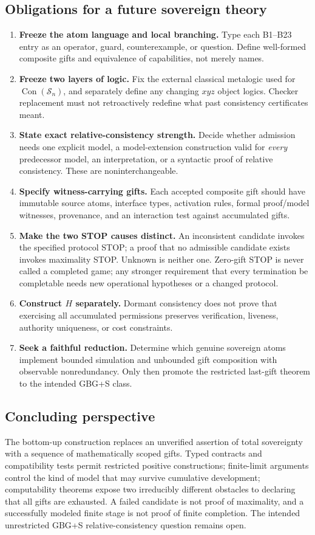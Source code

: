 \documentclass[11pt,letterpaper]{article}
\theoremstyle{definition}\newtheorem{definition}[theorem]{Definition}\newtheorem{example}[theorem]{Example}
\theoremstyle{remark}\newtheorem{remark}[theorem]{Remark}
\newcommand{\Con}{\operatorname{Con}}
\newcommand{\Stage}{\mathcal{S}}
\begin{document}
\subsection{Obligations for a future sovereign theory}
\begin{enumerate}
\item \textbf{Freeze the atom language and local branching.} Type each B1--B23 entry as an operator, guard, counterexample, or question. Define well-formed composite gifts and equivalence of capabilities, not merely names.
\item \textbf{Freeze two layers of logic.} Fix the external classical metalogic used for $\Con(\Stage_n)$, and separately define any changing $xyz$ object logics. Checker replacement must not retroactively redefine what past consistency certificates meant.
\item \textbf{State exact relative-consistency strength.} Decide whether admission needs one explicit model, a model-extension construction valid for \emph{every} predecessor model, an interpretation, or a syntactic proof of relative consistency. These are noninterchangeable.
\item \textbf{Specify witness-carrying gifts.} Each accepted composite gift should have immutable source atoms, interface types, activation rules, formal proof/model witnesses, provenance, and an interaction test against accumulated gifts.
\item \textbf{Make the two STOP causes distinct.} An inconsistent candidate invokes the specified protocol STOP; a proof that no admissible candidate exists invokes maximality STOP. Unknown is neither one. Zero-gift STOP is never called a completed game; any stronger requirement that every termination be completable needs new operational hypotheses or a changed protocol.
\item \textbf{Construct $H$ separately.} Dormant consistency does not prove that exercising all accumulated permissions preserves verification, liveness, authority uniqueness, or cost constraints.
\item \textbf{Seek a faithful reduction.} Determine which genuine sovereign atoms implement bounded simulation and unbounded gift composition with observable nonredundancy. Only then promote the restricted last-gift theorem to the intended GBG+S class.
\end{enumerate}


\subsection{Concluding perspective}
The bottom-up construction replaces an unverified assertion of total sovereignty with a sequence of mathematically scoped gifts. Typed contracts and compatibility tests permit restricted positive constructions; finite-limit arguments control the kind of model that may survive cumulative development; computability theorems expose two irreducibly different obstacles to declaring that all gifts are exhausted. A failed candidate is not proof of maximality, and a successfully modeled finite stage is not proof of finite completion. The intended unrestricted GBG+S relative-consistency question remains open.
\end{document}
